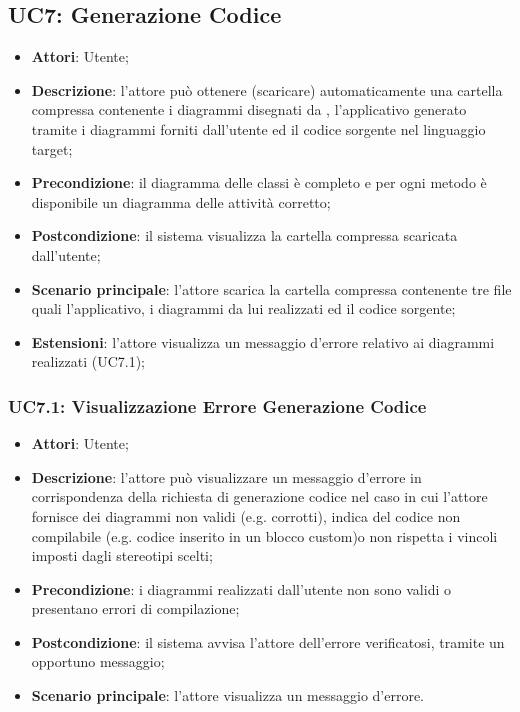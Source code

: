 \subsection{UC7: Generazione Codice}
\label{UC7}
\begin{itemize}
	\item \textbf{Attori}: Utente;
	\item \textbf{Descrizione}: l'attore può ottenere (scaricare) automaticamente una cartella compressa contenente i diagrammi disegnati da \proj{}, l'applicativo generato tramite i diagrammi forniti dall'utente ed il codice sorgente nel linguaggio target;
	\item \textbf{Precondizione}: il diagramma delle classi è completo e per ogni metodo è disponibile un diagramma delle attività corretto;
	\item \textbf{Postcondizione}: il sistema visualizza la cartella compressa scaricata dall'utente;
	\item \textbf{Scenario principale}: l'attore scarica la cartella compressa contenente tre file quali l'applicativo, i diagrammi da lui realizzati ed il codice sorgente;
	\item \textbf{Estensioni}: l'attore visualizza un messaggio d'errore relativo ai diagrammi realizzati (UC7.1); 
\end{itemize}

\subsubsection{UC7.1: Visualizzazione Errore Generazione Codice}
\label{UC7.1}
\begin{itemize}
	\item \textbf{Attori}: Utente;
	\item \textbf{Descrizione}: l'attore può visualizzare un messaggio d'errore in corrispondenza della richiesta di generazione codice nel caso in cui l'attore fornisce dei diagrammi non validi (e.g. corrotti), indica del codice non compilabile (e.g. codice inserito in un blocco custom)o non rispetta i vincoli imposti dagli stereotipi scelti;
	\item \textbf{Precondizione}: i diagrammi realizzati dall'utente non sono validi o presentano errori di compilazione;%
	\item \textbf{Postcondizione}: il sistema avvisa l'attore dell'errore verificatosi, tramite un opportuno messaggio;
	\item \textbf{Scenario principale}: l'attore visualizza un messaggio d'errore.
\end{itemize}



